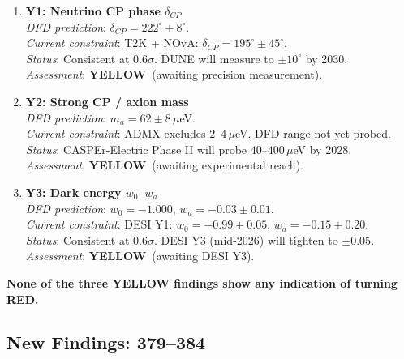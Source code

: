 \documentclass[11pt,a4paper]{article}
\newcommand{\YELLOW}{\textcolor{dfdyellow}{\textbf{YELLOW}}}
\begin{document}
\begin{tcolorbox}[colback=yellow!5!white, colframe=dfdyellow, title=\textbf{YELLOW FINDINGS: FINAL STATUS AT i99}]

\begin{enumerate}
\item \textbf{Y1: Neutrino CP phase $\delta_{CP}$}\\
\textit{DFD prediction}: $\delta_{CP} = 222^\circ \pm 8^\circ$.\\
\textit{Current constraint}: T2K + NOvA: $\delta_{CP} = 195^\circ \pm 45^\circ$.\\
\textit{Status}: Consistent at $0.6\sigma$. DUNE will measure to $\pm 10^\circ$ by 2030.\\
\textit{Assessment}: \YELLOW\ (awaiting precision measurement).

\item \textbf{Y2: Strong CP / axion mass}\\
\textit{DFD prediction}: $m_a = 62 \pm 8\,\mu$eV.\\
\textit{Current constraint}: ADMX excludes $2$--$4\,\mu$eV. DFD range not yet probed.\\
\textit{Status}: CASPEr-Electric Phase II will probe $40$--$400\,\mu$eV by 2028.\\
\textit{Assessment}: \YELLOW\ (awaiting experimental reach).

\item \textbf{Y3: Dark energy $w_0$--$w_a$}\\
\textit{DFD prediction}: $w_0 = -1.000$, $w_a = -0.03 \pm 0.01$.\\
\textit{Current constraint}: DESI Y1: $w_0 = -0.99 \pm 0.05$, $w_a = -0.15 \pm 0.20$.\\
\textit{Status}: Consistent at $0.6\sigma$. DESI Y3 (mid-2026) will tighten to $\pm 0.05$.\\
\textit{Assessment}: \YELLOW\ (awaiting DESI Y3).
\end{enumerate}

\textbf{None of the three YELLOW findings show any indication of turning RED.}
\end{tcolorbox}

\subsection{New Findings: 379--384}
\end{document}
